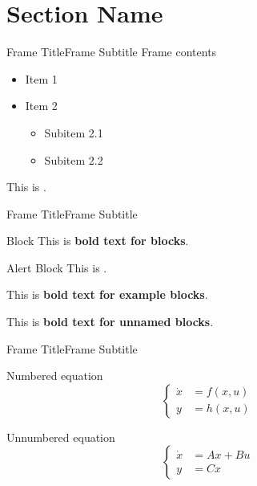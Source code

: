 \section{Section Name}
\graphicspath{{figs/section1/}} %

\begin{frame}{Frame Title}{Frame Subtitle}
    Frame contents
     \begin{itemize}
        \item Item 1
        \item Item 2
        \begin{itemize}
            \item Subitem 2.1 
            \item Subitem 2.2 
        \end{itemize}
    \end{itemize}
    This is .
\end{frame}

\begin{frame}{Frame Title}{Frame Subtitle}
    \begin{block}{Block}
        This is \textbf{bold text for blocks}.
    \end{block}
    \begin{alertblock}{Alert Block}
        This is .
    \end{alertblock}
    \begin{example}
        This is \textbf{bold text for example blocks}.
    \end{example}
    \begin{block}{}
        \centering
        This is \textbf{bold text for unnamed blocks}.
    \end{block}
\end{frame}

\begin{frame}{Frame Title}{Frame Subtitle}
\begin{block}{Numbered equation}
    \begin{equation}
        \label{eq:nlsys}
        \left\{
        \begin{aligned}
            \dot{x} &= f(x, u)\\
            y &= h(x,u)
        \end{aligned}
        \right.
    \end{equation}
\end{block}
\begin{block}{Unnumbered equation}
    \begin{equation*}
        \label{eq:lsys}
        \left\{
        \begin{aligned}
            \dot{x} &= Ax + Bu\\
            y &= Cx
        \end{aligned}
        \right.
    \end{equation*}
\end{block}
\end{frame}

